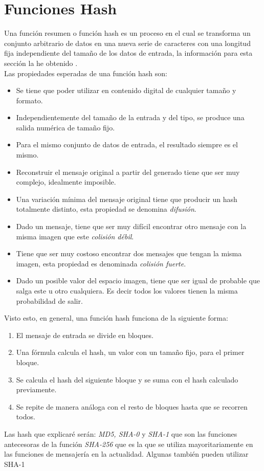 \section{Funciones Hash}
Una función resumen o función hash es un proceso en el cual se transforma un conjunto arbitrario de datos en una nueva serie de caracteres con una longitud fija independiente del tamaño de los datos de entrada, la información para esta sección la he obtenido \cite{aepd}.\\
Las propiedades esperadas de una función hash son:
\begin{itemize}
	\item Se tiene que poder utilizar en contenido digital de cualquier tamaño y formato.
	\item Independientemente del tamaño de la entrada y del tipo, se produce una salida numérica de tamaño fijo.
	\item Para el mismo conjunto de datos de entrada, el resultado siempre es el mismo.
	\item Reconstruir el mensaje original a partir del generado tiene que ser muy complejo, idealmente imposible.
	\item Una variación mínima del mensaje original tiene que producir un hash totalmente distinto, esta propiedad se denomina \emph{difusión}.
	\item Dado un mensaje, tiene que ser muy difícil encontrar otro mensaje con la misma imagen que este \emph{colisión débil}.
	\item Tiene que ser muy costoso encontrar dos mensajes que tengan la misma imagen, esta propiedad es denominada \emph{colisión fuerte}.
	\item Dado un posible valor del espacio imagen, tiene que ser igual de probable que salga este u otro cualquiera. Es decir todos los valores tienen la misma probabilidad de salir.
\end{itemize}

Visto esto, en general, una función hash funciona de la siguiente forma:
\begin{enumerate}
	\item El mensaje de entrada se divide en bloques.
	\item Una fórmula calcula el hash, un valor con un tamaño fijo, para el primer bloque.
	\item Se calcula el hash del siguiente bloque y se suma con el hash calculado previamente.
	\item Se repite de manera análoga con el resto de bloques hasta que se recorren todos.
\end{enumerate}
Las hash que explicaré serán: \emph{MD5, SHA-0} y \emph{SHA-1} que son las funciones antecesoras de la función \emph{SHA-256} que es la que se utiliza mayoritariamente en las funciones de mensajería en la actualidad. Algunas también pueden utilizar SHA-1\\

